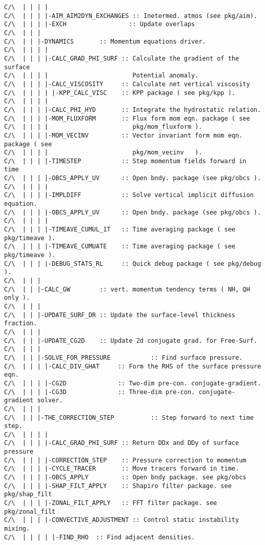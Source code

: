 \begin{verbatim}
C/\  | | | |
C/\  | | | |-AIM_AIM2DYN_EXCHANGES :: Inetermed. atmos (see pkg/aim).
C/\  | | | |-EXCH                 :: Update overlaps
C/\  | | |
C/\  | | |-DYNAMICS       :: Momentum equations driver.
C/\  | | | |
C/\  | | | |-CALC_GRAD_PHI_SURF :: Calculate the gradient of the surface 
C/\  | | | |                       Potential anomaly.
C/\  | | | |-CALC_VISCOSITY     :: Calculate net vertical viscosity
C/\  | | | | |-KPP_CALC_VISC    :: KPP package ( see pkg/kpp ).
C/\  | | | |                                                      
C/\  | | | |-CALC_PHI_HYD       :: Integrate the hydrostatic relation.
C/\  | | | |-MOM_FLUXFORM       :: Flux form mom eqn. package ( see
C/\  | | | |                       pkg/mom_fluxform ).
C/\  | | | |-MOM_VECINV         :: Vector invariant form mom eqn. package ( see
C/\  | | | |                       pkg/mom_vecinv   ).
C/\  | | | |-TIMESTEP           :: Step momentum fields forward in time
C/\  | | | |-OBCS_APPLY_UV      :: Open bndy. package (see pkg/obcs ).
C/\  | | | |
C/\  | | | |-IMPLDIFF           :: Solve vertical implicit diffusion equation.
C/\  | | | |-OBCS_APPLY_UV      :: Open bndy. package (see pkg/obcs ).
C/\  | | | |
C/\  | | | |-TIMEAVE_CUMUL_1T   :: Time averaging package ( see pkg/timeave ).
C/\  | | | |-TIMEAVE_CUMUATE    :: Time averaging package ( see pkg/timeave ).
C/\  | | | |-DEBUG_STATS_RL     :: Quick debug package ( see pkg/debug ).
C/\  | | |
C/\  | | |-CALC_GW        :: vert. momentum tendency terms ( NH, QH only ).
C/\  | | |
C/\  | | |-UPDATE_SURF_DR :: Update the surface-level thickness fraction.
C/\  | | |
C/\  | | |-UPDATE_CG2D    :: Update 2d conjugate grad. for Free-Surf.
C/\  | | |
C/\  | | |-SOLVE_FOR_PRESSURE           :: Find surface pressure.
C/\  | | | |-CALC_DIV_GHAT     :: Form the RHS of the surface pressure eqn.
C/\  | | | |-CG2D              :: Two-dim pre-con. conjugate-gradient.
C/\  | | | |-CG3D              :: Three-dim pre-con. conjugate-gradient solver.
C/\  | | |
C/\  | | |-THE_CORRECTION_STEP          :: Step forward to next time step.
C/\  | | | |
C/\  | | | |-CALC_GRAD_PHI_SURF :: Return DDx and DDy of surface pressure
C/\  | | | |-CORRECTION_STEP    :: Pressure correction to momentum
C/\  | | | |-CYCLE_TRACER       :: Move tracers forward in time.
C/\  | | | |-OBCS_APPLY         :: Open bndy package. see pkg/obcs
C/\  | | | |-SHAP_FILT_APPLY    :: Shapiro filter package. see pkg/shap_filt
C/\  | | | |-ZONAL_FILT_APPLY   :: FFT filter package. see pkg/zonal_filt
C/\  | | | |-CONVECTIVE_ADJUSTMENT :: Control static instability mixing.
C/\  | | | | |-FIND_RHO  :: Find adjacent densities.

\end{verbatim}
